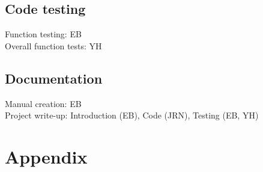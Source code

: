 \documentclass[11pt]{article}
\begin{document}
\subsection{Code testing}
Function testing: EB\\
Overall function tests: YH

\subsection{Documentation}
Manual creation: EB\\
Project write-up: Introduction (EB), Code (JRN), Testing (EB, YH)

\section{Appendix}
\label{sec:appendix}

\end{document}
